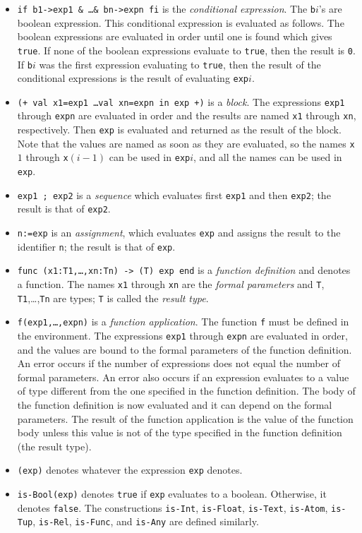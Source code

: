 \documentclass[a4,14pt,latin1]{article}
\begin{document}
\begin{itemize}
\item
{\tt if b1->exp1 \& \ldots \& bn->expn fi} is the {\em conditional expression}.
The {\tt b}$i$'s are boolean expression. This conditional expression
is evaluated as follows. The boolean expressions are evaluated in order
until one is found which gives {\tt true}. If none of the boolean expressions
evaluate to {\tt true}, then the result is \verb"0". If {\tt b}$i$ was the first
expression evaluating to {\tt true},
then the result of the conditional expressions is the
result of evaluating {\tt exp}$i$.
\item
{\tt (+ val x1=exp1 \ldots val xn=expn in exp +)} is a {\em block}. The
expressions {\tt exp1} through {\tt expn} are evaluated in order and the
results are named {\tt x1} through {\tt xn}, respectively.
Then {\tt exp} is evaluated and returned as the result of the block.
Note that the values are named as soon as they are evaluated,
so the names {\tt x}$1$ through {\tt x}$(i-1)$ can be used in {\tt exp}$i$,
and all the names can be used in {\tt exp}.
\item
{\tt exp1 ; exp2} is a {\em sequence} which evaluates first \verb"exp1"
and then \verb"exp2"; the result is that of \verb"exp2".
\item
{\tt n:=exp} is an {\em assignment}, which evaluates \verb"exp" and assigns
the result to the identifier \verb"n"; the result is that of \verb"exp".
\item
{\tt func (x1:T1,\ldots,xn:Tn) -> (T) exp end} is a {\em function definition\/}
and denotes a function. The names {\tt x1} through {\tt xn} are the
{\em formal parameters} and
{\tt T}, {\tt T1},\ldots,{\tt Tn} are types;
{\tt T} is called the {\em result type}.

\item
{\tt f(exp1,\ldots,expn)} is a {\em function application}. The function {\tt f}
must be defined in the environment.
The expressions {\tt exp1} through {\tt expn} are evaluated in order, and the
values are bound to the formal parameters of the function definition.
An error occurs if the number of expressions does not equal the number of
formal parameters. An error also occurs if an expression evaluates to a value
of type different from the one specified in the function definition.
The body of the function definition is now evaluated and it can depend on the
formal parameters. The result of the function application is the value
of the function body unless this value is not of the type specified in
the function definition (the result type).
\item
{\tt (exp)} denotes whatever the expression {\tt exp} denotes.
\item
{\tt is-Bool(exp)} denotes {\tt true} if {\tt exp} evaluates to a
boolean. Otherwise, it denotes {\tt false}. The constructions
{\tt is-Int}, {\tt is-Float}, {\tt is-Text}, {\tt is-Atom}, {\tt is-Tup}, {\tt is-Rel},
{\tt is-Func}, and {\tt is-Any} are defined similarly.


\end{itemize}
\end{document}
